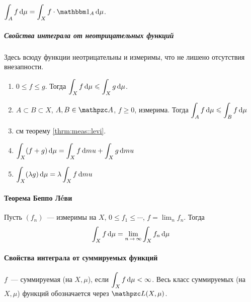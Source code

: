 \documentclass[draft, timbord]{longnotes}
\begin{document}
\begin{prop}\label{prop:meas::mfun::intind}
  $\displaystyle \int_A f \, \del \mu = \int _X f \cdot \ind _A \, \del \mu$.
\end{prop}

\subparagraph{Свойства интеграла от неотрицательных функций}

Здесь всюду функции неотрицательны и измеримы, что не лишено отсутствия внезапности.
\begin{enumerate}
  \item $0 \leqslant f \leqslant g$. Тогда
    $\displaystyle \int_X f\, \mathrm{d} \mu  \leqslant \int_X g\, \mathrm{d} \mu$.
  \item $A \subset B \subset X$, $A , B \in \alg$, $f \geqslant 0$, измерима.
    Тогда $\displaystyle \int_A f \, \mathrm{d} \mu \leqslant \int_B f\, \mathrm{d} \mu$
  \item см теорему \ref{thrm:meas::levi}.
  \item $\displaystyle \int_X (f+g)\, \mathrm{d} \mu = \int_X f\,\mathrm{d} mu + \int_X g\,\mathrm{d} mu $
  \item $\displaystyle \int_X (\lambda g)\, \mathrm{d} \mu =  \lambda \int_X f\,\mathrm{d} mu $
\end{enumerate}

\paragraph{Теорема Беппо \texorpdfstring{Л\'eви}{Леви}}
\label{par:meas::levi}

\begin{thrm}\label{thrm:meas::levi}
  Пусть $(f_n)$~--- измеримы на $X$, $0 \leqslant f_1 \leqslant \cdots $, 
  $f = \lim_n f_n$. Тогда 
  \[
    \int_X f \, \del \mu  = \lim_{n\to \infty} \int_X f_n \, \del \mu 
  \]
\end{thrm}

\paragraph{Свойства интеграла от суммируемых функций}
\label{par:meas::summprop}

\begin{defn}\label{defn:meas::summprop::summ}
  $f$~--- суммируемая (на $X,\mu$), если $\displaystyle \int _X f \, \mathrm{d} \mu < \infty$.
  Весь класс суммируемых (на $X,\mu$) функций обозначается через $\summb (X,\mu)$.
\end{defn}
\end{document}
